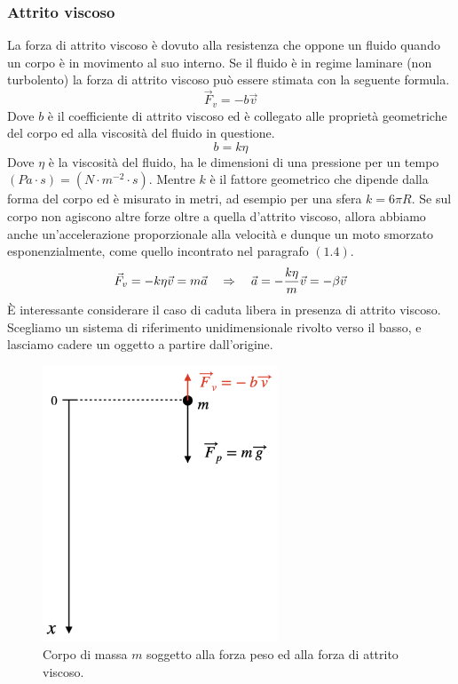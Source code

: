 \subsubsection{Attrito viscoso}
La forza di attrito viscoso è dovuto alla resistenza che oppone un fluido
quando un corpo è in movimento al suo interno. Se il fluido è in regime
laminare (non turbolento) la forza di attrito viscoso può essere stimata
con la seguente formula.
\begin{equation}
    \vec F_v = -b\vec v
\label{eq:forces:viscous}
\end{equation}
Dove $b$ è il coefficiente di attrito viscoso ed è collegato alle proprietà
geometriche del corpo ed alla viscosità del fluido in questione.
\begin{equation}
    b = k\eta
\label{eq:forces:viscous_coefficient}
\end{equation}
Dove $\eta$ è la viscosità del fluido, ha le dimensioni di una pressione per
un tempo $(Pa \cdot s) =(N\cdot m^{-2}\cdot s)$. Mentre $k$ è il fattore
geometrico che dipende dalla forma del corpo ed è misurato in metri, ad
esempio per una sfera $k = 6\pi R$.
Se sul corpo non agiscono altre forze oltre a quella d'attrito viscoso,
allora abbiamo anche un'accelerazione proporzionale alla velocità e dunque
un moto smorzato esponenzialmente, come quello incontrato nel paragrafo $(1.4)$.
\begin{equation}
    \vec F_v = -k\eta\vec v = m\vec a \quad\Rightarrow\quad
    \vec a = -\frac{k\eta}m\vec v =-\beta \vec v 
\end{equation}
È interessante considerare il caso di caduta libera in presenza di attrito
viscoso. Scegliamo un sistema di riferimento unidimensionale rivolto verso
il basso, e lasciamo cadere un oggetto a partire dall'origine.
\begin{figure}[htbp]
    \begin{center}
        \includegraphics[width=7cm]{images/cadlibera.png}
        \caption{Corpo di massa $m$ soggetto alla forza peso ed
        alla forza di attrito viscoso.}
\end{center}
\label{fig:forces:freefall}
\end{figure}
